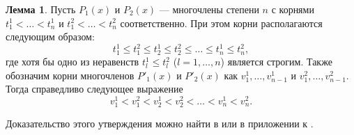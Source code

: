 \documentclass[specialist,
               substylefile = spbu.rtx,
               subf,href,colorlinks=true, 12pt]{disser}
\theoremstyle{definition}
\newtheorem{lemma}{Лемма}
\begin{document}
  \begin{lemma}
  \label{lemma:droots}
  	Пусть $P_1(x)$ и $P_2(x)$ --- многочлены степени $n$ с корнями $t^1_1 < \ldots < t^1_n$ и $t^2_1 < \ldots < t^2_n$ соответственно. При этом корни располагаются следующим образом:
  	\begin{equation*}
  		t^1_1 \leqslant t^2_1 \leqslant t^1_2 \leqslant t^2_2 \leqslant \ldots \leqslant t^1_n \leqslant t^2_n,
  	\end{equation*}
  	где хотя бы одно из неравенств $t_l^1 \leqslant t_l^2$ ($l = 1, \ldots, n$) является строгим. Также обозначим корни многочленов $P'_1(x)$ и $P'_2(x)$ как $v_1^1, \ldots, v_{n-1}^1$ и $v_1^2, \ldots, v_{n-1}^2$. Тогда справедливо следующее выражение
  	\begin{equation*}
  		v^1_1 < v^2_1 < v^1_2 < v^2_2 < \ldots < v^1_n < v^2_n.
  	\end{equation*}
  \end{lemma}
  Доказательство этого утверждения можно найти в \cite{sahmphd} или в приложении к \cite{melasmain}.
	
\end{document}
